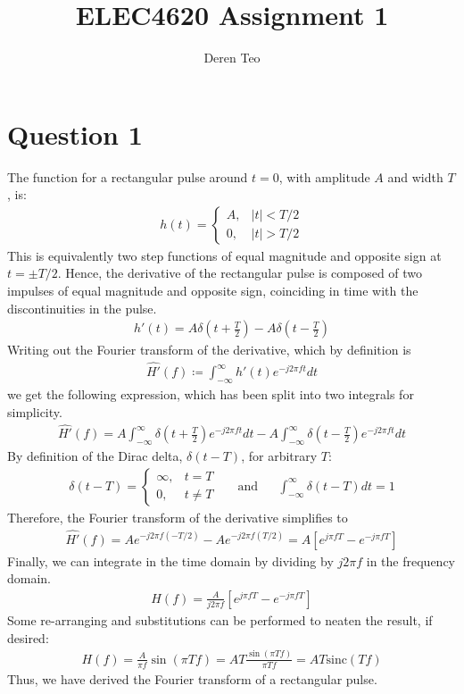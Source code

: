 \documentclass[a4paper, 11pt]{article}
\title{ELEC4620 Assignment 1}
\author{Deren Teo}
\begin{document}
\maketitle

\section*{Question 1}

The function for a rectangular pulse around $t=0$, with amplitude $A$ and width
$T$, is:
\begin{align*}
    h(t) = \begin{cases}
        A, & |t| < T/2 \\
        0, & |t| > T/2
    \end{cases}
\end{align*}
This is equivalently two step functions of equal magnitude and opposite sign at
$t=\pm T/2$. Hence, the derivative of the rectangular pulse is composed of two
impulses of equal magnitude and opposite sign, coinciding in time with the
discontinuities in the pulse.
\begin{align*}
    h'(t) = A \delta(t+\frac{T}{2}) - A \delta(t-\frac{T}{2})
\end{align*}
Writing out the Fourier transform of the derivative, which by definition is
\begin{align*}
    \widehat{H'}(f) \coloneqq \int_{-\infty}^{\infty} h'(t) e^{-j2\pi ft} dt
\end{align*}
we get the following expression, which has been split into two integrals for
simplicity.
\begin{align*}
    \widehat{H'}(f) = A \int_{-\infty}^{\infty} \delta(t + \frac{T}{2}) e^{-j2\pi ft} dt -
            A \int_{-\infty}^{\infty} \delta(t - \frac{T}{2}) e^{-j2\pi ft} dt
\end{align*}
By definition of the Dirac delta, $\delta(t-T)$, for arbitrary $T$:
\begin{align*}
    \delta(t-T) = \begin{cases}
        \infty, & t = T \\
        0,      & t \neq T
    \end{cases}
    && \text{and} &&
    \int_{-\infty}^{\infty} \delta(t-T) dt = 1
\end{align*}
Therefore, the Fourier transform of the derivative simplifies to
\begin{align*}
    \widehat{H'}(f) = Ae^{-j2\pi f(-T/2)} - Ae^{-j2\pi f(T/2)}
          = A \left[ e^{j\pi fT} - e^{-j\pi fT}\right]
\end{align*}
Finally, we can integrate in the time domain by dividing by $j2\pi f$ in the
frequency domain.
\begin{align*}
    H(f) = \frac{A}{j2\pi f} \left[ e^{j\pi fT} - e^{-j\pi fT}\right]
\end{align*}
Some re-arranging and substitutions can be performed to neaten the result, if desired:
\begin{align*}
    H(f) = \frac{A}{\pi f}\sin(\pi Tf)
         = AT\frac{\sin(\pi Tf)}{\pi Tf}
         = AT\text{sinc}(Tf)
\end{align*}
Thus, we have derived the Fourier transform of a rectangular pulse.
\end{document}
